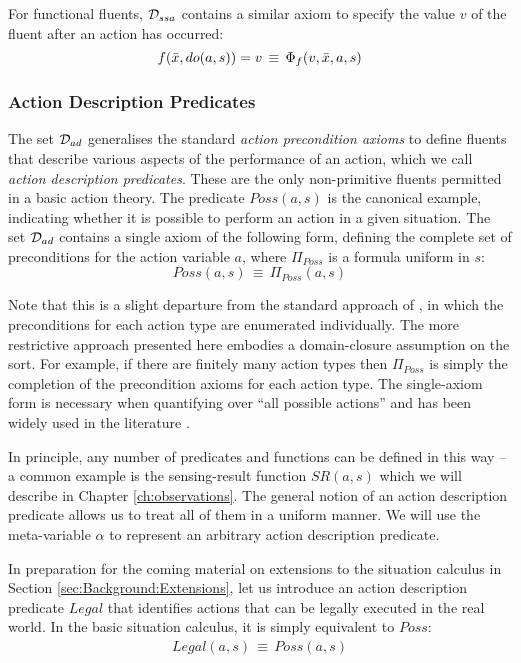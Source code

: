 For functional fluents, $\mathcal{D}_{ssa}$ contains a similar axiom to specify
the value $v$ of the fluent after an action has occurred:\[
f(\bar{x},do(a,s))=v\,\equiv\,\Phi_{f}(v,\bar{x},a,s)\]



\subsubsection{Action Description Predicates}

The set $\mathcal{D}_{ad}$ generalises the standard \emph{action precondition
axioms} \citep{pirri99contributions_sitcalc} to define fluents that
describe various aspects of the performance of an action, which we
call \emph{action description predicates}. These are the only non-primitive
fluents permitted in a basic action theory. The predicate $Poss(a,s)$
is the canonical example, indicating whether it is possible to perform
an action in a given situation. The set $\mathcal{D}_{ad}$ contains a single
axiom of the following form, defining the complete set of preconditions
for the action variable $a$, where $\Pi_{Poss}$ is a formula uniform
in $s$:\[
Poss(a,s)\,\equiv\,\Pi_{Poss}(a,s)\]


Note that this is a slight departure from the standard approach of
\citep{pirri99contributions_sitcalc}, in which the preconditions
for each action type are enumerated individually. The more restrictive
approach presented here embodies a domain-closure assumption on the
 sort. For example, if there are finitely many action
types then $\Pi_{Poss}$ is simply the completion of the precondition
axioms for each action type. The single-axiom form is necessary when
quantifying over {}``all possible actions'' and has been widely
used in the literature \citep{vassos08progression_future_queries,savelli06sc_quantum_levels}.

In principle, any number of predicates and functions can be defined
in this way -- a common example is the sensing-result function $SR(a,s)$
which we will describe in Chapter \ref{ch:observations}. The general
notion of an action description predicate allows us to treat all of
them in a uniform manner. We will use the meta-variable $\alpha$
to represent an arbitrary action description predicate.

In preparation for the coming material on extensions to the situation
calculus in Section \ref{sec:Background:Extensions}, let us introduce
an action description predicate $Legal$ that identifies actions that
can be legally executed in the real world. In the basic situation
calculus, it is simply equivalent to $Poss$:\begin{gather*}
Legal(a,s)\,\equiv\, Poss(a,s)\end{gather*}


